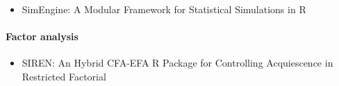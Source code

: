 \begin{itemize}
\tightlist
\item
  SimEngine: A Modular Framework for Statistical Simulations in R
\end{itemize}

\paragraph{Factor analysis}\label{factor-analysis}

\begin{itemize}
\tightlist
\item
  SIREN: An Hybrid CFA-EFA R Package for Controlling Acquiescence in Restricted Factorial
\end{itemize}


\address{%
Rob J Hyndman\\
Monash University\\%
\\
%
\url{https://journal.r-project.org}\\%
%
\href{mailto:r-journal@r-project.org}{\nolinkurl{r-journal@r-project.org}}%
}
